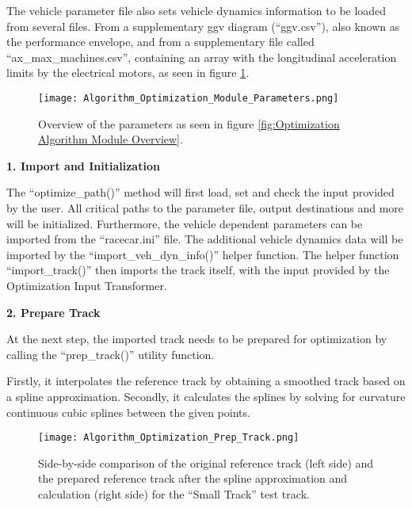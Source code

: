 The vehicle parameter file also sets vehicle dynamics information to be loaded from several files. From a supplementary \Gls{ggv} diagram (``ggv.csv''), also known as the performance envelope, and from a supplementary file called ``ax\_max\_machines.csv'', containing an array with the longitudinal acceleration limits by the electrical motors, as seen in figure \ref{fig:Optimization Algorithm Module Parameters}.
\begin{figure}[H]
    \centering
    \texttt{[image: Algorithm\_Optimization\_Module\_Parameters.png]}
    \caption{Overview of the parameters as seen in figure \ref{fig:Optimization Algorithm Module Overview}.}
    \label{fig:Optimization Algorithm Module Parameters}
\end{figure}

\textbf{1. Import and Initialization}

The ``optimize\_path()'' method will first load, set and check the input provided by the user. All critical paths to the parameter file, output destinations and more will be initialized. Furthermore, the vehicle dependent parameters can be imported from the ``racecar.ini'' file. The additional vehicle dynamics data will be imported by the ``import\_veh\_dyn\_info()'' helper function. The helper function ``import\_track()'' then imports the track itself, with the input provided by the Optimization Input Transformer.

\textbf{2. Prepare Track}

At the next step, the imported track needs to be prepared for optimization by calling the ``prep\_track()'' utility function.

Firstly, it interpolates the reference track by obtaining a smoothed track based on a spline approximation. Secondly, it calculates the splines by solving for curvature continuous cubic splines between the given points.
\begin{figure}[H]
    \centering
    \texttt{[image: Algorithm\_Optimization\_Prep\_Track.png]}
    \caption{Side-by-side comparison of the original reference track (left side) and the prepared reference track after the spline approximation and calculation (right side) for the ``Small Track'' test track.}
    \label{fig:Optimization Algorithm Prepare Track}
\end{figure}

\pagebreak

